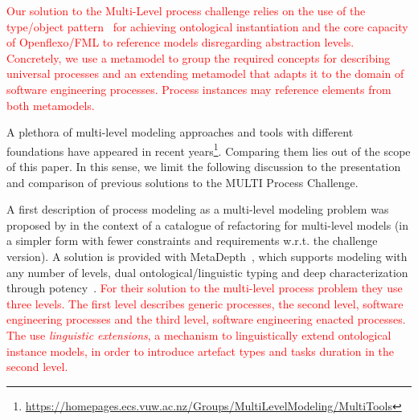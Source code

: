 

\textcolor{red}{Our solution to the Multi-Level process challenge relies on the use of the type/object pattern~\citep{typeObject} for achieving ontological instantiation and the core capacity of Openflexo/FML to reference models disregarding abstraction levels. Concretely, we use a metamodel to group the required concepts for describing universal processes and an extending metamodel that adapts it to the domain of software engineering processes. Process instances may reference elements from both metamodels.}

A plethora of multi-level modeling approaches and tools with different foundations have appeared in recent years\footnote{\url{https://homepages.ecs.vuw.ac.nz/Groups/MultiLevelModeling/MultiTools}}. Comparing them lies out of the scope of this paper. In this sense, we limit the following discussion to the presentation and comparison of previous solutions to the MULTI Process Challenge.

A first description of process modeling as a multi-level modeling problem was proposed by \parencite{lara2018refactoring} in the context of a catalogue of refactoring for multi-level models (in a simpler form with fewer constraints and requirements w.r.t. the challenge version). A solution is provided with MetaDepth~\parencite{metadepth}, which supports modeling with any number of levels, dual ontological/linguistic typing and deep characterization through potency~\citep{potency}. \textcolor{red}{For their solution to the multi-level process problem they use three levels. The first level describes generic processes, the second level, software engineering processes and the third level, software engineering enacted processes. The use \emph{linguistic extensions}\citep{metadepth}, a mechanism to  linguistically extend ontological instance models, in order to introduce artefact types and tasks duration in the second level.}

